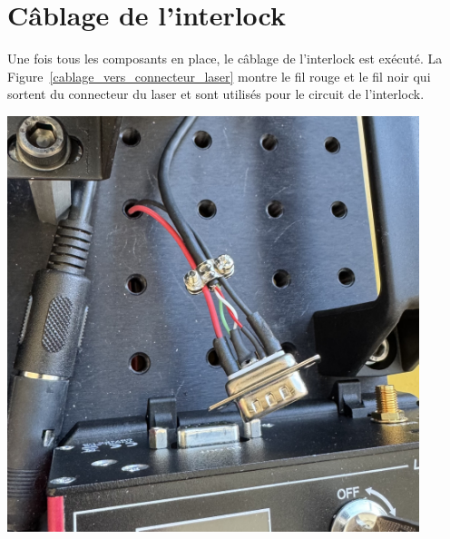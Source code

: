 \section{Câblage de l'interlock}
\begin{minipage}[c]{0.48\textwidth}
    Une fois tous les composants en place, le câblage de l'interlock est exécuté. La Figure~\ref{cablage_vers_connecteur_laser} montre le fil rouge et le fil noir qui sortent du connecteur du laser et sont utilisés pour le circuit de l'interlock.
\end{minipage}\hfill
\begin{minipage}[c]{0.48\textwidth}
    \begin{center}
        \includegraphics[width=0.9\textwidth]{assets/figures/Protections_laser/Securite_electrique/cablage_vers_connecteur_laser.jpeg}
    \end{center}
    \label{cablage_vers_connecteur_laser}
\end{minipage}

